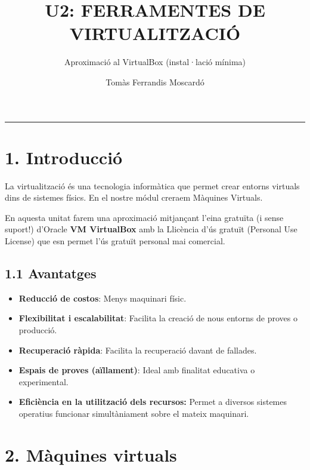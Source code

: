 \documentclass[
  12 pt,
  a4paper,
]{article}
\title{U2: FERRAMENTES DE VIRTUALITZACIÓ}
\subtitle{Aproximació al VirtualBox (instal·lació mínima)}
\author{Tomàs Ferrandis Moscardó}
\date{}
\providecommand{\tightlist}{%
  \setlength{\itemsep}{0pt}\setlength{\parskip}{0pt}}
\begin{document}
\maketitle

{
\setcounter{tocdepth}{2}
\tableofcontents
}
\newpage
\renewcommand\tablename{Tabla}

\begin{center}\rule{0.5\linewidth}{0.5pt}\end{center}

\section{1. Introducció}\label{introducciuxf3}

La virtualització és una tecnologia informàtica que permet crear entorns
virtuals dins de sistemes físics. En el nostre módul creraem Màquines
Virtuals.

En aquesta unitat farem una aproximació mitjançant l'eina gratuïta (i
sense suport!) d'Oracle \textbf{VM VirtualBox} amb la Llicència d'ús
gratuït (Personal Use License) que esn permet l'ús gratuït personal mai
comercial.

\subsection{1.1 Avantatges}\label{avantatges}

\begin{itemize}
\tightlist
\item
  \textbf{Reducció de costos}: Menys maquinari físic.
\item
  \textbf{Flexibilitat i escalabilitat}: Facilita la creació de nous
  entorns de proves o producció.
\item
  \textbf{Recuperació ràpida}: Facilita la recuperació davant de
  fallades.
\item
  \textbf{Espais de proves (aïllament)}: Ideal amb finalitat educativa o
  experimental.
\item
  \textbf{Eficiència en la utilització dels recursos:} Permet a diversos
  sistemes operatius funcionar simultàniament sobre el mateix maquinari.
\end{itemize}

\section{2. Màquines virtuals}\label{muxe0quines-virtuals}
\end{document}
